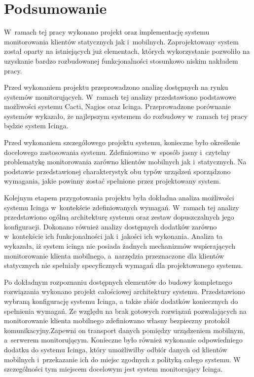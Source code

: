 \chapter{Podsumowanie}
\label{chap:Podsumowanie}

W~ramach tej pracy wykonano projekt oraz implementację systemu
monitorowania klientów statycznych jak i~mobilnych. Zaprojektowany
system został oparty na istniejących już elementach, których
wykorzystanie pozwoliło na uzyskanie bardzo rozbudowanej
funkcjonalności stosunkowo niskim nakładem pracy.

Przed wykonaniem projektu przeprowadzono analizę dostępnych na rynku
systemów monitorujących. W~ramach tej analizy przedstawiono podstawowe
możliwości systemu Cacti, Nagios oraz Icinga. Przeprowadzone
porównanie systemów wykazało, że najlepszym systemem do rozbudowy
w~ramach tej pracy będzie system Icinga.

Przed wykonaniem szczegółowego projektu systemu, konieczne było
określenie docelowego zastosowania systemu. Zdefiniowano w~sposób
jasny i~czytelny problematykę monitorowania zarówno klientów mobilnych
jak i~statycznych. Na podstawie przedstawionej charakterystyk obu typów
urządzeń sporządzono wymagania, jakie powinny zostać spełnione przez
projektowany system.

Kolejnym etapem przygotowania projektu była dokładna analiza
możliwości systemu Icinga w~kontekście zdefiniowanych
wymagań. W~ramach tej analizy przedstawiono ogólną architekturę
systemu oraz zestaw dopuszczalnych jego konfiguracji. Dokonano również
analizy dostępnych dodatków zarówno w~kontekście ich funkcjonalności
jak i~jakości ich wykonania. Analiza ta wykazała, iż system icinga nie
posiada żadnych mechanizmów wspierających monitorowanie klienta
mobilnego, a~narzędzia przeznaczone dla klientów statycznych nie
spełniały specyficznych wymagań dla projektowanego systemu.

Po dokładnym rozpoznaniu dostępnych elementów do budowy kompletnego
rozwiązania wykonano projekt całościowej architektury
systemu. Przedstawiono wybraną konfigurację systemu Icinga, a także
zbiór dodatków koniecznych do spełnienia wymagań. Ze względu na brak
gotowych rozwiązań pozwalających na monitorowanie klienta mobilnego
zdefiniowano własny bezpieczny protokół komunikacyjny.Zapewni on
transport danych pomiędzy urządzeniem mobilnym, a~serwerem
monitorującym. Konieczne było również wykonanie odpowiedniego dodatku
do systemu Icinga, który umożliwiłby odbiór danych od klientów
mobilnych i~przekazanie ich do miejsc zgodnych z polityką całego
systemu. W szczególności tym miejscem docelowym jest system
monitorujący Icinga.

